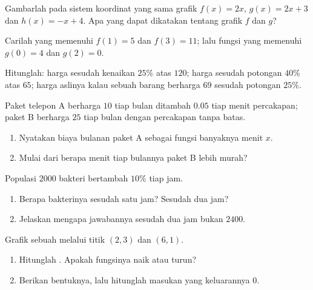 \begin{exercise}[$\star$]\label{exo:g9:linfunc:4}
Gambarlah pada sistem koordinat yang sama grafik $f(x) = 2x$,
$g(x) = 2x + 3$ dan $h(x) = -x + 4$. Apa yang dapat dikatakan tentang
grafik $f$ dan $g$?
\end{exercise}

\begin{exercise}[$\star$]\label{exo:g9:linfunc:5}
Carilah  yang memenuhi $f(1) = 5$ dan $f(3) = 11$; lalu
fungsi yang memenuhi $g(0) = 4$ dan $g(2) = 0$.
\end{exercise}

\begin{exercise}[$\star\star$]\label{exo:g9:linfunc:6}
Hitunglah: harga sesudah kenaikan $25\%$ atas $120$; harga sesudah
potongan $40\%$ atas $65$; harga aslinya kalau sebuah barang berharga
$69$ sesudah potongan $25\%$.
\end{exercise}

\begin{exercise}[$\star\star$]\label{exo:g9:linfunc:7}
Paket telepon A berharga $10$ tiap bulan ditambah $0.05$ tiap menit
percakapan; paket B berharga $25$ tiap bulan dengan percakapan tanpa
batas.
\begin{enumerate}
  \item Nyatakan biaya bulanan paket A sebagai fungsi banyaknya menit
        $x$.
  \item Mulai dari berapa menit tiap bulannya paket B lebih murah?
\end{enumerate}
\end{exercise}

\begin{exercise}[$\star\star$]\label{exo:g9:linfunc:8}
Populasi $2000$ bakteri bertambah $10\%$ tiap jam.
\begin{enumerate}
  \item Berapa bakterinya sesudah satu jam? Sesudah dua jam?
  \item Jelaskan mengapa jawabannya sesudah dua jam bukan $2400$.
\end{enumerate}
\end{exercise}

\begin{exercise}[$\star\star$]\label{exo:g9:linfunc:9}
Grafik sebuah  melalui titik $(2, 3)$ dan
$(6, 1)$.
\begin{enumerate}
  \item Hitunglah . Apakah fungsinya naik atau turun?
  \item Berikan bentuknya, lalu hitunglah masukan yang keluarannya
        $0$.
\end{enumerate}
\end{exercise}


